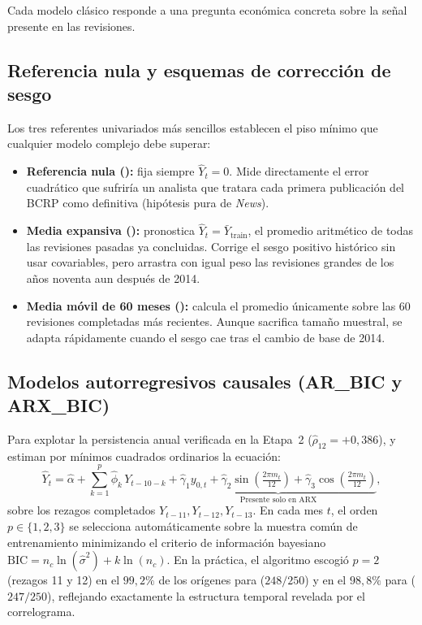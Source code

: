 \documentclass[12pt,letterpaper]{article}
\begin{document}
Cada modelo clásico responde a una pregunta económica concreta sobre la señal presente en las revisiones.

\subsection{Referencia nula y esquemas de corrección de sesgo}

Los tres referentes univariados más sencillos establecen el piso mínimo que cualquier modelo complejo debe superar:
\begin{itemize}
  \item \textbf{Referencia nula ():} fija siempre \(\widehat{Y}_t = 0\). Mide directamente el error cuadrático que sufriría un analista que tratara cada primera publicación del BCRP como definitiva (hipótesis pura de \emph{News}).
  \item \textbf{Media expansiva ():} pronostica \(\widehat{Y}_t = \bar{Y}_{\text{train}}\), el promedio aritmético de todas las revisiones pasadas ya concluidas. Corrige el sesgo positivo histórico sin usar covariables, pero arrastra con igual peso las revisiones grandes de los años noventa aun después de 2014.
  \item \textbf{Media móvil de 60 meses ():} calcula el promedio únicamente sobre las \(60\) revisiones completadas más recientes. Aunque sacrifica tamaño muestral, se adapta rápidamente cuando el sesgo cae tras el cambio de base de 2014.
\end{itemize}

\subsection{Modelos autorregresivos causales (AR\_BIC y ARX\_BIC)}

Para explotar la persistencia anual verificada en la Etapa~2 (\(\hat{\rho}_{12} = +0{,}386\)),  y  estiman por mínimos cuadrados ordinarios la ecuación:
\begin{equation}
  \widehat{Y}_t = \hat{\alpha} + \sum_{k=1}^{p} \hat{\phi}_k\, Y_{t-10-k} + \underbrace{\hat{\gamma}_1 y_{0,t} + \hat{\gamma}_2 \sin\!\left(\tfrac{2\pi m_t}{12}\right) + \hat{\gamma}_3 \cos\!\left(\tfrac{2\pi m_t}{12}\right)}_{\text{Presente solo en ARX}},
  \label{eq:ar_arx}
\end{equation}
sobre los rezagos completados \(Y_{t-11}, Y_{t-12}, Y_{t-13}\). En cada mes \(t\), el orden \(p \in \{1, 2, 3\}\) se selecciona automáticamente sobre la muestra común de entrenamiento minimizando el criterio de información bayesiano \(\text{BIC} = n_c \ln(\hat{\sigma}^2) + k \ln(n_c)\). En la práctica, el algoritmo escogió \(p = 2\) (rezagos 11 y 12) en el \(99{,}2\%\) de los orígenes para  (\(248/250\)) y en el \(98{,}8\%\) para  (\(247/250\)), reflejando exactamente la estructura temporal revelada por el correlograma.
\end{document}
